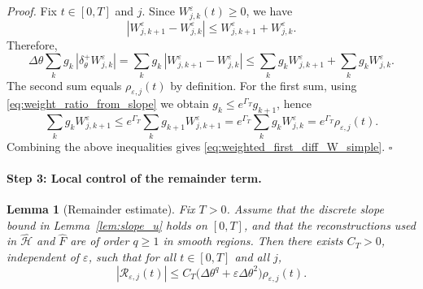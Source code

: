 \documentclass[11pt, dina4, amsfont12]{article}
\newtheorem{lemma}{Lemma}[section]
\begin{document}
\textit{Proof.}
Fix $t\in[0,T]$ and $j$. Since $W_{j,k}^\varepsilon(t)\ge0$, we have
\[
|W_{j,k+1}^\varepsilon-W_{j,k}^\varepsilon|
\le W_{j,k+1}^\varepsilon+W_{j,k}^\varepsilon.
\]
Therefore,
\[
\Delta\theta\sum_k g_k\,|\delta_\theta^+W_{j,k}^\varepsilon|
=
\sum_k g_k\,|W_{j,k+1}^\varepsilon-W_{j,k}^\varepsilon|
\le
\sum_k g_k W_{j,k+1}^\varepsilon+\sum_k g_k W_{j,k}^\varepsilon.
\]
The second sum equals $\rho_{\varepsilon,j}(t)$ by definition.
For the first sum, using \eqref{eq:weight_ratio_from_slope} we obtain
$g_k\le e^{\Gamma_T}g_{k+1}$, hence
\[
\sum_k g_k W_{j,k+1}^\varepsilon
\le
e^{\Gamma_T}\sum_k g_{k+1} W_{j,k+1}^\varepsilon
=
e^{\Gamma_T}\sum_k g_k W_{j,k}^\varepsilon
=
e^{\Gamma_T}\rho_{\varepsilon,j}(t).
\]
Combining the above inequalities gives \eqref{eq:weighted_first_diff_W_simple}.
\hfill$\square$




\paragraph{Step 3: Local control of the remainder term.}

\begin{lemma}[Remainder estimate]\label{lem:R_est}
Fix $T>0$. Assume that the discrete slope bound in Lemma~\ref{lem:slope_u} holds
on $[0,T]$, and that the reconstructions used in $\widehat{\mathcal H}$ and
$\widehat F$ are of order $q\ge1$ in smooth regions. Then there exists $C_T>0$,
independent of $\varepsilon$, such that for all $t\in[0,T]$ and all $j$,
\[
|\mathcal R_{\varepsilon,j}(t)|
\le
C_T\big(\Delta\theta^q+\varepsilon\Delta\theta^2\big)\rho_{\varepsilon,j}(t).
\]
\end{lemma}
\end{document}
